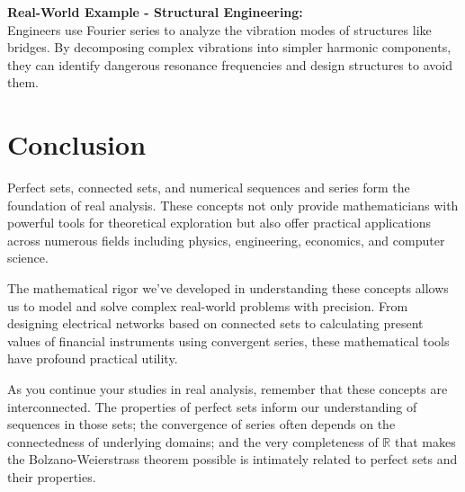 \documentclass{article}
\begin{document}
\textbf{Real-World Example - Structural Engineering:} \\
Engineers use Fourier series to analyze the vibration modes of structures like bridges. By decomposing complex vibrations into simpler harmonic components, they can identify dangerous resonance frequencies and design structures to avoid them.

\bigskip

\section*{Conclusion}

Perfect sets, connected sets, and numerical sequences and series form the foundation of real analysis. These concepts not only provide mathematicians with powerful tools for theoretical exploration but also offer practical applications across numerous fields including physics, engineering, economics, and computer science.

The mathematical rigor we've developed in understanding these concepts allows us to model and solve complex real-world problems with precision. From designing electrical networks based on connected sets to calculating present values of financial instruments using convergent series, these mathematical tools have profound practical utility.

As you continue your studies in real analysis, remember that these concepts are interconnected. The properties of perfect sets inform our understanding of sequences in those sets; the convergence of series often depends on the connectedness of underlying domains; and the very completeness of $\mathbb{R}$ that makes the Bolzano-Weierstrass theorem possible is intimately related to perfect sets and their properties.
\end{document}
